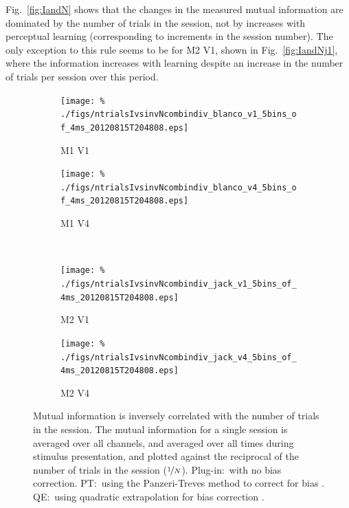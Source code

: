 Fig.~\ref{fig:IandN} shows that the changes in the measured mutual information are dominated by the number of trials in the session, not by increases with perceptual learning (corresponding to increments in the session number).
The only exception to this rule seems to be for M2 V1, shown in Fig.~\ref{fig:IandNj1}, where the information increases with learning despite an increase in the number of trials per session over this period.

% 
% 
\begin{figure}[htbp]
    \begin{subfigure}[b]{0.5\linewidth}
        \centering
        \caption{\small{}M1 V1}
        \label{fig:IvNb1}
        \texttt{[image: \%
./figs/ntrialsIvsinvNcombindiv\_blanco\_v1\_5bins\_of\_4ms\_20120815T204808.eps]}
    \end{subfigure}
    \begin{subfigure}[b]{0.5\linewidth}
        \centering
        \caption{\small{}M1 V4}
        \label{fig:IvNb4}
        \texttt{[image: \%
./figs/ntrialsIvsinvNcombindiv\_blanco\_v4\_5bins\_of\_4ms\_20120815T204808.eps]}
    \end{subfigure}
    \\
    \begin{subfigure}[b]{0.5\linewidth}
        \centering
        \caption{\small{}M2 V1}
        \label{fig:IvNj1}
        \texttt{[image: \%
./figs/ntrialsIvsinvNcombindiv\_jack\_v1\_5bins\_of\_4ms\_20120815T204808.eps]}
    \end{subfigure}
    \begin{subfigure}[b]{0.5\linewidth}
        \centering
        \caption{\small{}M2 V4}
        \label{fig:IvNj4}
        \texttt{[image: \%
./figs/ntrialsIvsinvNcombindiv\_jack\_v4\_5bins\_of\_4ms\_20120815T204808.eps]}
    \end{subfigure}
    \caption{\small{}Mutual information is inversely correlated with the number of trials in the session. The mutual information for a single session is averaged over all channels, and averaged over all times during stimulus presentation, and plotted against the reciprocal of the number of trials in the session ($\nicefrac{1}{N}$). Plug-in:~with no bias correction. PT:~using the Panzeri-Treves method to correct for bias \cite{Panzeri1996}. QE:~using quadratic extrapolation for bias correction \cite{Strong1998}.
}
    \label{fig:IvN}
\end{figure}

